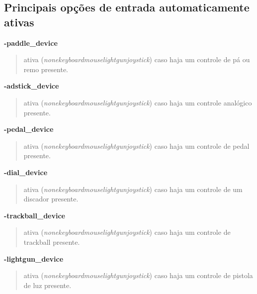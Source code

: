 \documentclass[letterpaper,10pt,brazil]{sphinxmanual}
\begin{document}
\subsection{Principais opções de entrada automaticamente ativas}
\label{commandline/commandline-all:principais-opcoes-de-entrada-automaticamente-ativas}\label{commandline/commandline-all:mame-commandline-paddledevice}
\textbf{-paddle\_device}
\begin{quote}

ativa (\emph{none\textbar{}keyboard\textbar{}mouse\textbar{}lightgun\textbar{}joystick})
caso haja um controle de pá ou remo presente.
\end{quote}
\label{commandline/commandline-all:mame-commandline-adstickdevice}
\textbf{-adstick\_device}
\begin{quote}

ativa (\emph{none\textbar{}keyboard\textbar{}mouse\textbar{}lightgun\textbar{}joystick})
caso haja um controle analógico presente.
\end{quote}
\label{commandline/commandline-all:mame-commandline-pedaldevice}
\textbf{-pedal\_device}
\begin{quote}

ativa (\emph{none\textbar{}keyboard\textbar{}mouse\textbar{}lightgun\textbar{}joystick})
caso haja um controle de pedal presente.
\end{quote}
\label{commandline/commandline-all:mame-commandline-dialdevice}
\textbf{-dial\_device}
\begin{quote}

ativa (\emph{none\textbar{}keyboard\textbar{}mouse\textbar{}lightgun\textbar{}joystick})
caso haja um controle de um discador presente.
\end{quote}
\label{commandline/commandline-all:mame-commandline-trackballdevice}
\textbf{-trackball\_device}
\begin{quote}

ativa (\emph{none\textbar{}keyboard\textbar{}mouse\textbar{}lightgun\textbar{}joystick})
caso haja um controle de trackball presente.
\end{quote}
\label{commandline/commandline-all:mame-commandline-lightgundevice}
\textbf{-lightgun\_device}
\begin{quote}

ativa (\emph{none\textbar{}keyboard\textbar{}mouse\textbar{}lightgun\textbar{}joystick})
caso haja um controle de pistola de luz presente.
\end{quote}
\end{document}
